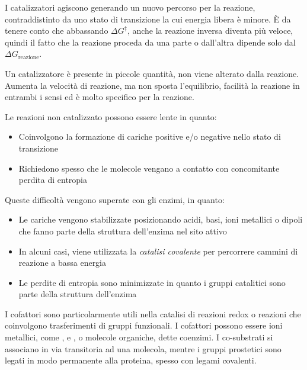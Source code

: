 I catalizzatori agiscono generando un nuovo percorso per la reazione, contraddistinto da uno stato di transizione la cui energia libera è minore.
È da tenere conto che abbassando $\Delta G^{\ddagger}$, anche la reazione inversa diventa più veloce, quindi il fatto che la reazione proceda da una parte o dall'altra dipende solo dal $\Delta G_{\text{reazione}}$.




Un catalizzatore è presente in piccole quantità, non viene alterato dalla reazione. Aumenta la velocità di reazione, ma non sposta l'equilibrio, facilità la reazione in entrambi i sensi ed è molto specifico per la reazione.

Le reazioni non catalizzato possono essere lente in quanto:
\begin{itemize}
\item Coinvolgono la formazione di cariche positive e/o negative nello stato di transizione
\item Richiedono spesso che le molecole vengano a contatto con concomitante perdita di entropia
\end{itemize}

Queste difficoltà vengono superate con gli enzimi, in quanto:
\begin{itemize}
\item Le cariche vengono stabilizzate posizionando acidi, basi, ioni metallici o dipoli che fanno parte della struttura dell'enzima nel sito attivo
\item In alcuni casi, viene utilizzata la \emph{catalisi covalente} per percorrere cammini di reazione a bassa energia
\item Le perdite di entropia sono minimizzate in quanto i gruppi catalitici sono parte della struttura dell'enzima
\end{itemize}

I cofattori sono particolarmente utili nella catalisi di reazioni redox o reazioni che coinvolgono trasferimenti di gruppi funzionali. I cofattori possono essere ioni metallici, come ,  e , o molecole organiche, dette coenzimi. I co-substrati si associano in via transitoria ad una molecola, mentre i gruppi prostetici sono legati in modo permanente alla proteina, spesso con legami covalenti.

